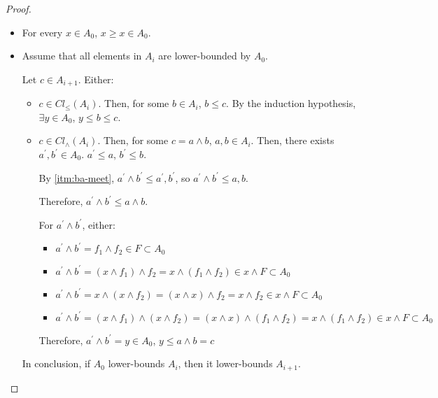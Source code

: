\documentclass[notitlepage,a4paper]{article}
\begin{document}
\begin{enumerate}
\begin{proof}
\begin{description}
               \begin{itemize}
                 \item For every $x \in A_0$, $x ≥ x \in A_0$. 
                 \item Assume that all elements in $A_i$ are lower-bounded
                   by $A_0$.

                   Let $c \in A_{i+1}$. Either:
                   
                   \begin{itemize}
                     \item $c \in Cl_{≤}(A_i)$. Then, for some $b \in A_i$,
                       $b ≤ c$. By the induction hypothesis, $\exists y \in A_0$,
                       $y ≤ b ≤ c$.

                     \item $c \in Cl_{∧}(A_i)$. Then, for some $c = a ∧ b$,
                       $a, b \in A_i$. Then, there exists $a^\prime, b^\prime \in A_0$.
                       $a^\prime ≤ a$, $b^\prime ≤ b$.

                       By \ref{itm:ba-meet}, $a^\prime ∧ b^\prime ≤ a^\prime, b^\prime$,
                       so $a^\prime ∧ b^\prime ≤ a, b$.

                       Therefore, $a^\prime ∧ b^\prime ≤ a ∧ b$.

                       For $a^\prime ∧ b^\prime$, either:

                       \begin{itemize}
                         \item $a^\prime ∧ b^\prime = f_1 ∧ f_2 ∈ F \subset A_0$
                         \item $a^\prime ∧ b^\prime = (x ∧ f_1) ∧ f_2 = x ∧ (f_1 ∧ f_2) ∈ x ∧ F \subset A_0$
                         \item $a^\prime ∧ b^\prime = x ∧ (x ∧ f_2) = (x ∧ x) ∧ f_2 = x ∧ f_2 ∈ x ∧ F \subset A_0$
                         \item $a^\prime ∧ b^\prime = (x ∧ f_1) ∧ (x ∧ f_2) = (x ∧ x) ∧ (f_1 ∧ f_2) = x ∧ (f_1 ∧ f_2) ∈ x ∧ F \subset A_0$
                       \end{itemize}

                       Therefore, $a^\prime ∧ b^\prime = y ∈ A_0$, $y ≤ a ∧ b = c$
                  \end{itemize}

                   In conclusion, if $A_{0}$ lower-bounds $A_{i}$, then
                   it lower-bounds $A_{i+1}$.
               \end{itemize}
           \end{description}


\end{proof}
\end{enumerate}
\end{document}
